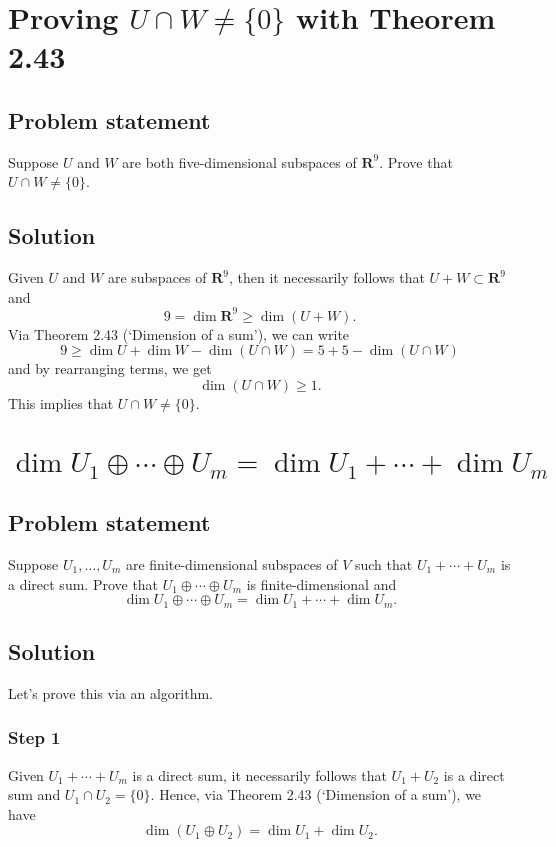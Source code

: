 \documentclass{article}
\begin{document}
\clearpage

\renewcommand{\thesection}{12}
\section{Proving $U\cap W\neq\{0\}$ with Theorem 2.43}
\subsection*{Problem statement}
Suppose $U$ and $W$ are both five-dimensional subspaces of $\mathbf{R}^9$. 
Prove that\newline $U\cap W\neq\{0\}$.

\subsection*{Solution}
Given $U$ and $W$ are subspaces of $\mathbf{R}^9$, then it necessarily follows that $U+W\subset\mathbf{R}^9$ and
\[9=\dim\mathbf{R}^9\geq \dim(U+W).\]
Via Theorem 2.43 (`Dimension of a sum'), we can write
\[9\geq\operatorname{dim}U+\operatorname{dim}W-\operatorname{dim}(U\cap W)=5+5-\operatorname{dim}(U\cap W)\]
and by rearranging terms, we get
\[\operatorname{dim}(U\cap W)\geq 1.\]
This implies that $U\cap W\neq\{0\}$.

\clearpage

\renewcommand{\thesection}{16}
\section{$\dim U_1\oplus\cdots\oplus U_m = \dim U_1 +\cdots+ \dim U_m$}
\subsection*{Problem statement}
Suppose $U_1,\ldots,U_m$ are finite-dimensional subspaces of $V$ such that $U_1+\cdots + U_m$ is a direct sum. 
Prove that $U_1\oplus\cdots\oplus U_m$ is finite-dimensional and 
\[\dim U_1\oplus\cdots\oplus U_m = \dim U_1 +\cdots+ \dim U_m.\]

\subsection*{Solution}
Let's prove this via an algorithm. 

\subsubsection*{Step 1}
Given $U_1+\cdots + U_m$ is a direct sum, it necessarily follows that $U_1+U_2$ is a direct sum and $U_1\cap U_2=\{0\}$. 
Hence, via Theorem 2.43 (`Dimension of a sum'), we have
\[\dim(U_1\oplus U_2)=\dim U_1+\dim U_2.\]
\end{document}

